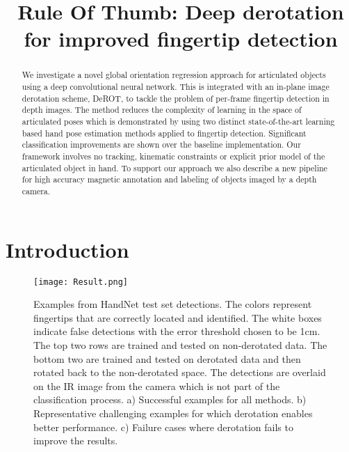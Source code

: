 \documentclass{bmvc2k}
\title{Rule Of Thumb: Deep derotation for improved fingertip detection}
\begin{document}
\maketitle


\begin{abstract}
We investigate a novel global orientation regression approach for articulated 
 objects using a deep convolutional neural network. This is integrated with an in-plane image derotation scheme, DeROT, to tackle the problem of per-frame fingertip detection in depth images. The method reduces the complexity of learning in the space of articulated poses which is demonstrated by using two distinct state-of-the-art learning based hand pose estimation methods applied to fingertip detection. Significant classification improvements are shown over the baseline implementation. Our framework involves no tracking, kinematic constraints or explicit prior model of the articulated object in hand. To support our approach we also describe a new pipeline for high accuracy magnetic annotation and labeling of objects imaged by a depth camera. 
  
\end{abstract}




\section{Introduction} \label{sec:intro}

\begin{figure}[t]
\begin{center}
\texttt{[image: Result.png]}
\end{center}
   \caption{\scriptsize \color{blue} Examples from HandNet test set detections. The colors represent 
   fingertips that are correctly located and identified. The white boxes indicate false 
   detections with the error threshold chosen to be 1cm. The top two rows are trained and tested on 
   non-derotated data. The bottom two are trained and tested on derotated data and then rotated back 
   to the non-derotated space. The detections are overlaid on the IR image from the 
   camera which is not part of the classification process. a) Successful examples for all methods. 
   b) Representative challenging examples for which derotation enables better performance. 
   c) Failure cases where derotation fails to improve the results.}
   
\label{fig:fingertips}
\end{figure}
\end{document}
